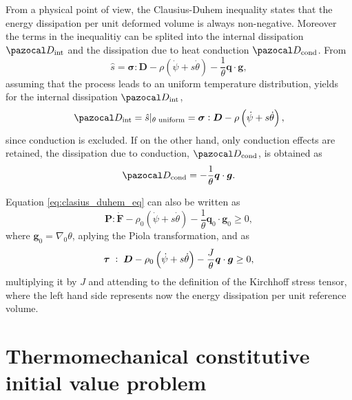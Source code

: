 From a physical point of view, the Clausius-Duhem inequality states that the energy dissipation per unit deformed volume is always non-negative.
Moreover the terms in the inequalitiy can be splited into the internal dissipation \(\pazocal D_\text{int}\) and the dissipation due to heat conduction \(\pazocal D_\text{cond}\).
From
\begin{equation}
\hat s = \bm \sigma :\bm D - \rho \left(\dot \psi  +s \dot \theta\right) -\frac{1}{\theta}\bm q\cdot\bm g,
\end{equation}
assuming that the process leads to an uniform temperature distribution, yields for the internal dissipation \(\pazocal D_\text{int}\),
\begin{equation} \label{eq:def_int_dissipation}
\pazocal D_\text{int} = \hat{s}|_{\text{$\theta$ uniform} }= \bm \sigma:\bm D - \rho \left(\dot \psi + s \dot \theta\right),
\end{equation}
since conduction is excluded.
If on the other hand, only conduction effects are retained, the dissipation due to conduction, \(\pazocal D_\text{cond}\), is obtained as
\begin{equation} \label{eq:dissipation_conduction}
\pazocal D_\text{cond} = - \frac{1}{\theta} \bm q\cdot \bm g.
\end{equation}

Equation \eqref{eq:clasius_duhem_eq} can also be written as
\begin{equation}
  \bm P\colon\dot{\bm F} - \rho_0(\dot\psi + s\dot \theta) - \frac{1}{\theta}\bm q_0\cdot \bm g_0 \geq 0,
\end{equation}
where \(\bm g_0 = \nabla_0 \theta\), aplying the Piola transformation, and as
\begin{equation}
    \bm{\tau}\;:\;\bm{D} -\rho_0\left(\dot\psi + s\dot \theta\right) -\frac{J}{\theta}\bm{q}\cdot \bm{g} \geq 0,
\end{equation}
multiplying it by $J$ and attending to the definition of the Kirchhoff stress tensor, where the left hand side represents now the energy dissipation per unit reference volume.


\section{Thermomechanical constitutive initial value problem} \label{sec:thermomechanical_constitutive}

